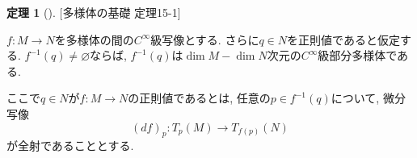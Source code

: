 \documentclass[dvipdfmx,a4paper,11pt]{article}
\theoremstyle{definition}
\newtheorem{thm}{定理}
\begin{document}
 \begin{tcolorbox}[
    colback = white,
    colframe = green!35!black,
    fonttitle = \bfseries,
    breakable = true]
    \begin{thm}[][多様体の基礎 定理15-1]
    \label{thm-regular}
    
$f : M \rightarrow N$を多様体の間の$C^{\infty}$級写像とする. さらに$q \in N$を正則値であると仮定する. 
$f^{-1}(q) \neq \varnothing $ならば, $f^{-1}(q) $は$\dim M - \dim N$次元の$C^\infty$級部分多様体である.

ここで$q \in N$が$f : M \rightarrow N$の正則値であるとは, 任意の$p \in f^{-1}(q)$について,
微分写像
$$
(df)_{p} : T_{p}(M) \rightarrow T_{f(p)}(N)
$$
が全射であることとする.
    \end{thm}
    \end{tcolorbox}
    
\end{document}
